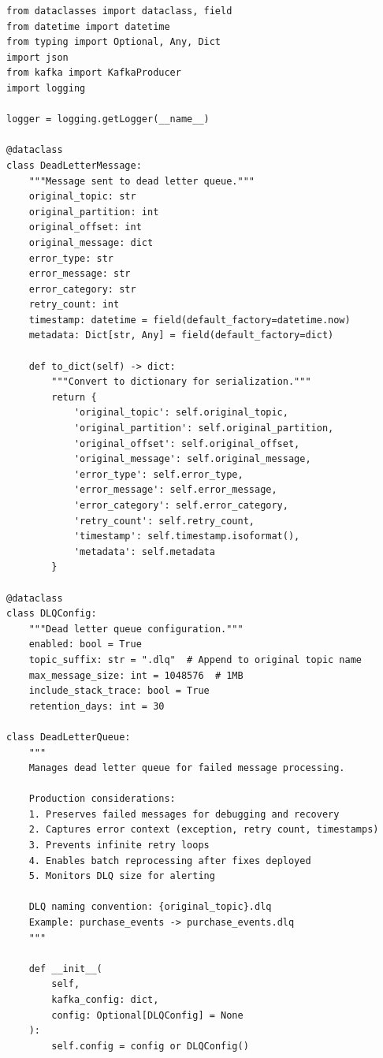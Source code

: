 \begin{lstlisting}[style=python, caption={Dead Letter Queue Implementation}]
from dataclasses import dataclass, field
from datetime import datetime
from typing import Optional, Any, Dict
import json
from kafka import KafkaProducer
import logging

logger = logging.getLogger(__name__)

@dataclass
class DeadLetterMessage:
    """Message sent to dead letter queue."""
    original_topic: str
    original_partition: int
    original_offset: int
    original_message: dict
    error_type: str
    error_message: str
    error_category: str
    retry_count: int
    timestamp: datetime = field(default_factory=datetime.now)
    metadata: Dict[str, Any] = field(default_factory=dict)

    def to_dict(self) -> dict:
        """Convert to dictionary for serialization."""
        return {
            'original_topic': self.original_topic,
            'original_partition': self.original_partition,
            'original_offset': self.original_offset,
            'original_message': self.original_message,
            'error_type': self.error_type,
            'error_message': self.error_message,
            'error_category': self.error_category,
            'retry_count': self.retry_count,
            'timestamp': self.timestamp.isoformat(),
            'metadata': self.metadata
        }

@dataclass
class DLQConfig:
    """Dead letter queue configuration."""
    enabled: bool = True
    topic_suffix: str = ".dlq"  # Append to original topic name
    max_message_size: int = 1048576  # 1MB
    include_stack_trace: bool = True
    retention_days: int = 30

class DeadLetterQueue:
    """
    Manages dead letter queue for failed message processing.

    Production considerations:
    1. Preserves failed messages for debugging and recovery
    2. Captures error context (exception, retry count, timestamps)
    3. Prevents infinite retry loops
    4. Enables batch reprocessing after fixes deployed
    5. Monitors DLQ size for alerting

    DLQ naming convention: {original_topic}.dlq
    Example: purchase_events -> purchase_events.dlq
    """

    def __init__(
        self,
        kafka_config: dict,
        config: Optional[DLQConfig] = None
    ):
        self.config = config or DLQConfig()


\end{lstlisting}

